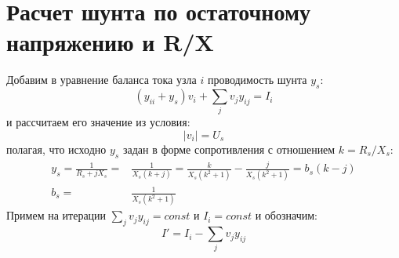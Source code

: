 \documentclass[lettersize,journal]{IEEEtran}
\begin{document}
	
\onecolumn









\section{Расчет шунта по остаточному напряжению и R/X}
Добавим в уравнение баланса тока узла \(i\) проводимость шунта \(y_s\):
\begin{equation}
	\label{eqn_current_balance}
	(y_{ii} + y_s)v_i + \sum_{j}{v_jy_{ij}} = I_i
\end{equation}
и рассчитаем его значение из условия:
\begin{equation}
 \label{eqn_Us_magnitude}
 |v_i|=U_s
\end{equation} 
полагая, что исходно \(y_s\) задан в форме сопротивления с отношением \(k=R_s/X_s\):
\begin{equation}
	\label{eqn_conductance}
	\begin{split}
	y_s = \frac{1}{R_s+jX_s}=&\frac{1}{X_s(k+j)}=\frac{k}{X_s(k^2+1)} - \frac{j}{X_s(k^2+1)}=b_s(k-j) \\ b_s =& \frac{1}{X_s(k^2+1)}
	\end{split}
\end{equation}
Примем на итерации
 \(\sum_{j}{v_jy_{ij}}=const\) и \(I_i=const\) и обозначим:
\begin{equation}
	\label{eqn_composite_current}
	I'= I_i - \sum_{j}{v_jy_{ij}}
\end{equation}
\end{document}
